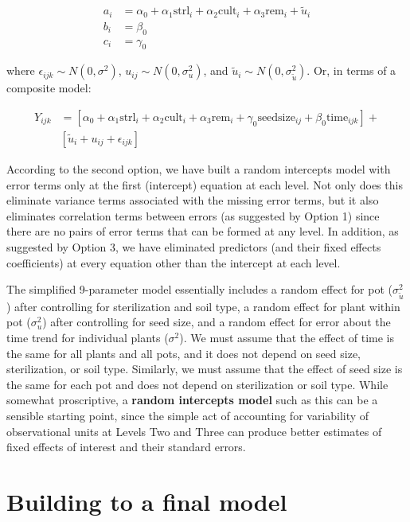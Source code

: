 \documentclass[
]{krantz}
\begin{document}
\begin{align*}
a_{i} & = \alpha_{0} + \alpha_{1}\textrm{strl}_{i} + \alpha_{2}\textrm{cult}_{i} + \alpha_{3}\textrm{rem}_{i} + \tilde{u}_{i} \\
b_{i} & = \beta_{0} \\
c_{i} & = \gamma_{0}
\end{align*}

where \(\epsilon_{ijk}\sim N(0,\sigma^2)\), \(u_{ij}\sim N(0,\sigma_{u}^{2})\), and \(\tilde{u}_{i}\sim N(0,\sigma_{\tilde{u}}^{2})\). Or, in terms of a composite model:

\begin{align*}
Y_{ijk} & = [\alpha_{0}+\alpha_{1}\textrm{strl}_{i}+\alpha_{2}\textrm{cult}_{i}+\alpha_{3}\textrm{rem}_{i} +
 \gamma_{0}\textrm{seedsize}_{ij} + \beta_{0}\textrm{time}_{ijk}] + \\
 &  [\tilde{u}_{i}+u_{ij}+\epsilon_{ijk}]
\end{align*}

According to the second option, we have built a random intercepts model with error terms only at the first (intercept) equation at each level. Not only does this eliminate variance terms associated with the missing error terms, but it also eliminates correlation terms between errors (as suggested by Option 1) since there are no pairs of error terms that can be formed at any level. In addition, as suggested by Option 3, we have eliminated predictors (and their fixed effects coefficients) at every equation other than the intercept at each level.

The simplified 9-parameter model essentially includes a random effect for pot (\(\sigma_{\tilde{u}}^{2}\)) after controlling for sterilization and soil type, a random effect for plant within pot (\(\sigma_{u}^{2}\)) after controlling for seed size, and a random effect for error about the time trend for individual plants (\(\sigma^{2}\)). We must assume that the effect of time is the same for all plants and all pots, and it does not depend on seed size, sterilization, or soil type. Similarly, we must assume that the effect of seed size is the same for each pot and does not depend on sterilization or soil type. While somewhat proscriptive, a \textbf{random intercepts model} such as this can be a sensible starting point, since the simple act of accounting for variability of observational units at Levels Two and Three can produce better estimates of fixed effects of interest and their standard errors.

\hypertarget{modelsDEF}{%
\section{Building to a final model}\label{modelsDEF}}
\end{document}

